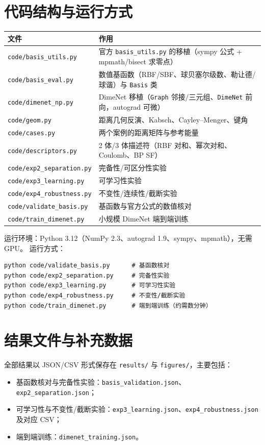 \documentclass[UTF8,a4paper,11pt]{ctexart}
\begin{document}
\appendix
\section{代码结构与运行方式}
\label{app:code}
\begin{table}[H]
\centering\small
\begin{tabular}{@{}ll@{}}
\toprule
文件 & 作用\\
\midrule
\texttt{code/basis\_utils.py} & 官方 \texttt{basis\_utils.py} 的移植（sympy 公式 + mpmath/bisect 求零点）\\
\texttt{code/basis\_eval.py} & 数值基函数（RBF/SBF、球贝塞尔级数、勒让德/球谐）与 \texttt{Basis} 类\\
\texttt{code/dimenet\_np.py} & DimeNet 移植（\texttt{Graph} 邻接/三元组、\texttt{DimeNet} 前向，autograd 可微）\\
\texttt{code/geom.py} & 距离几何反演、Kabsch、Cayley--Menger、键角\\
\texttt{code/cases.py} & 两个案例的距离矩阵与参考能量\\
\texttt{code/descriptors.py} & 2 体/3 体描述符（RBF 对和、幂次对和、Coulomb、BP SF）\\
\texttt{code/exp2\_separation.py} & 完备性/可区分性实验\\
\texttt{code/exp3\_learning.py} & 可学习性实验\\
\texttt{code/exp4\_robustness.py} & 不变性/连续性/截断实验\\
\texttt{code/validate\_basis.py} & 基函数与官方公式的数值核对\\
\texttt{code/train\_dimenet.py} & 小规模 DimeNet 端到端训练\\
\bottomrule
\end{tabular}
\end{table}

运行环境：Python 3.12（NumPy 2.3、autograd 1.9、sympy、mpmath），无需 GPU。
运行方式：
\begin{verbatim}
python code/validate_basis.py      # 基函数核对
python code/exp2_separation.py     # 完备性实验
python code/exp3_learning.py       # 可学习性实验
python code/exp4_robustness.py     # 不变性/截断实验
python code/train_dimenet.py       # 端到端训练（约需数分钟）
\end{verbatim}

\section{结果文件与补充数据}
全部结果以 JSON/CSV 形式保存在 \texttt{results/} 与 \texttt{figures/}，主要包括：
\begin{itemize}[leftmargin=1.4em,itemsep=0pt]
\item 基函数核对与完备性实验：\texttt{basis\_validation.json}、\texttt{exp2\_separation.json}；
\item 可学习性与不变性/截断实验：\texttt{exp3\_learning.json}、\texttt{exp4\_robustness.json} 及对应 CSV；
\item 端到端训练：\texttt{dimenet\_training.json}。
\end{itemize}
\end{document}
